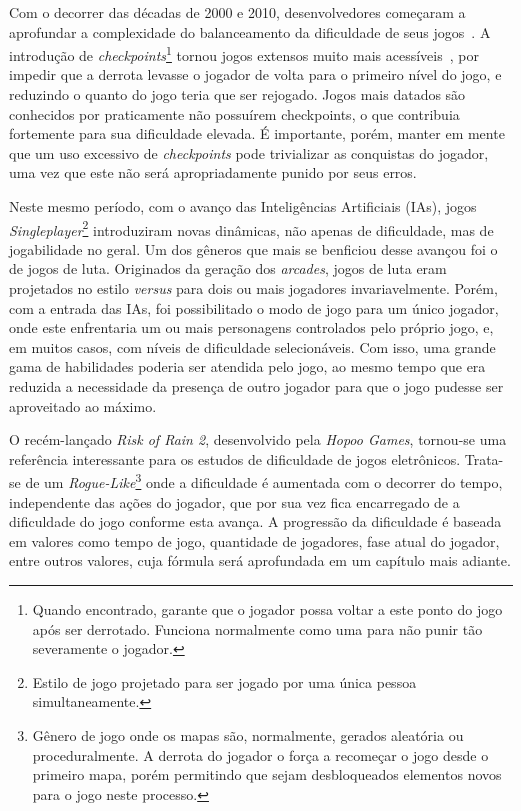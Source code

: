 Com o decorrer das décadas de 2000 e 2010, desenvolvedores começaram a aprofundar a complexidade do balanceamento da dificuldade de seus jogos~\citep{Zork:81}. A introdução de \textit{checkpoints}\footnote{
    Quando encontrado, garante que o jogador possa voltar a este ponto do jogo após ser derrotado. Funciona normalmente como uma \textquotedbl{} para não punir tão severamente o jogador.
} tornou jogos extensos muito mais acessíveis~\citep{GameTime}, por impedir que a derrota levasse o jogador de volta para o primeiro nível do jogo, e reduzindo o quanto do jogo teria que ser rejogado. Jogos mais datados são conhecidos por praticamente não possuírem checkpoints, o que contribuia fortemente para sua dificuldade elevada. É importante, porém, manter em mente que um uso excessivo de \textit{checkpoints} pode trivializar as conquistas do jogador, uma vez que este não será apropriadamente punido por seus erros.

Neste mesmo período, com o avanço das Inteligências Artificiais (IAs), jogos \textit{Singleplayer}\footnote{
    Estilo de jogo projetado para ser jogado por uma única pessoa simultaneamente.
} introduziram novas dinâmicas, não apenas de dificuldade, mas de jogabilidade no geral. Um dos gêneros que mais se benficiou desse avançou foi o de jogos de luta. Originados da geração dos \textit{arcades}, jogos de luta eram projetados no estilo \textit{versus} para dois ou mais jogadores invariavelmente. Porém, com a entrada das IAs, foi possibilitado o modo de jogo para um único jogador, onde este enfrentaria um ou mais personagens controlados pelo próprio jogo, e, em muitos casos, com níveis de dificuldade selecionáveis. Com isso, uma grande gama de habilidades poderia ser atendida pelo jogo, ao mesmo tempo que era reduzida a necessidade da presença de outro jogador para que o jogo pudesse ser aproveitado ao máximo.

O recém-lançado \textit{Risk of Rain 2}, desenvolvido pela \textit{Hopoo Games}, tornou-se uma referência interessante para os estudos de dificuldade de jogos eletrônicos. Trata-se de um \textit{Rogue-Like}\footnote{
    Gênero de jogo onde os mapas são, normalmente, gerados aleatória ou proceduralmente. A derrota do jogador o força a recomeçar o jogo desde o primeiro mapa, porém permitindo que sejam desbloqueados elementos novos para o jogo neste processo.
} onde a dificuldade é aumentada com o decorrer do tempo, independente das ações do jogador, que por sua vez fica encarregado de \textquotedbl{} a dificuldade do jogo conforme esta avança. A progressão da dificuldade é baseada em valores como tempo de jogo, quantidade de jogadores, fase atual do jogador, entre outros valores, cuja fórmula será aprofundada em um capítulo mais adiante.

